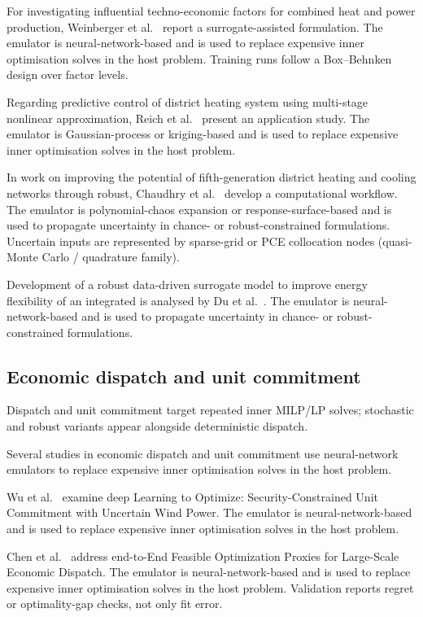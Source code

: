 For investigating influential techno-economic factors for combined heat and power production, Weinberger et al.~\cite{Weinberger2018555} report a surrogate-assisted formulation. The emulator is neural-network-based and is used to replace expensive inner optimisation solves in the host problem. Training runs follow a Box--Behnken design over factor levels.

Regarding predictive control of district heating system using multi-stage nonlinear approximation, Reich et al.~\cite{Reich2020} present an application study. The emulator is Gaussian-process or kriging-based and is used to replace expensive inner optimisation solves in the host problem.

In work on improving the potential of fifth-generation district heating and cooling networks through robust, Chaudhry et al.~\cite{Chaudhry2024} develop a computational workflow. The emulator is polynomial-chaos expansion or response-surface-based and is used to propagate uncertainty in chance- or robust-constrained formulations. Uncertain inputs are represented by sparse-grid or PCE collocation nodes (quasi-Monte Carlo / quadrature family).

Development of a robust data-driven surrogate model to improve energy flexibility of an integrated is analysed by Du et al.~\cite{Du2025}. The emulator is neural-network-based and is used to propagate uncertainty in chance- or robust-constrained formulations.

\subsection{Economic dispatch and unit commitment}
\label{sec:apps:dispatch}

Dispatch and unit commitment target repeated inner MILP/LP solves; stochastic and robust variants appear alongside deterministic dispatch.

Several studies in economic dispatch and unit commitment use neural-network emulators to replace expensive inner optimisation solves in the host problem.

Wu et al.~\cite{Wu2022231} examine deep Learning to Optimize: Security-Constrained Unit Commitment with Uncertain Wind Power. The emulator is neural-network-based and is used to replace expensive inner optimisation solves in the host problem.

Chen et al.~\cite{Chen20244723} address end-to-End Feasible Optimization Proxies for Large-Scale Economic Dispatch. The emulator is neural-network-based and is used to replace expensive inner optimisation solves in the host problem. Validation reports regret or optimality-gap checks, not only fit error.

